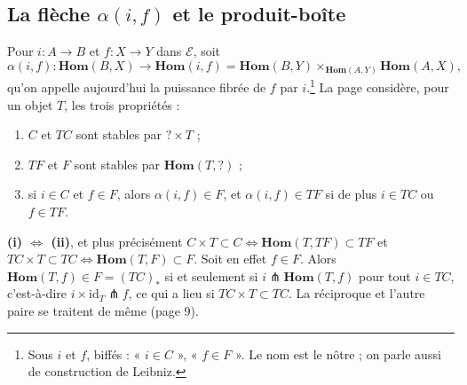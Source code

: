 \documentclass[11pt,a4paper]{article}
\begin{document}
\subsection*{La flèche $\alpha(i,f)$ et le produit-boîte}

Pour $i : A \to B$ et $f : X \to Y$ dans $\mathcal{E}$, soit
\[
\alpha(i,f) : \mathbf{Hom}(B, X) \longrightarrow \mathbf{Hom}(i,f)
= \mathbf{Hom}(B, Y) \times_{\mathbf{Hom}(A, Y)} \mathbf{Hom}(A, X),
\]
qu'on appelle aujourd'hui la puissance fibrée de $f$ par $i$.\footnote{Sous
$i$ et $f$, biffés : « $i \in C$ », « $f \in F$ ». Le nom est le nôtre ;
on parle aussi de construction de Leibniz.} La page considère, pour un objet
$T$, les trois propriétés :
\begin{enumerate}
\item[(i)] $C$ et $TC$ sont stables par $? \times T$ ;
\item[(ii)] $TF$ et $F$ sont stables par $\mathbf{Hom}(T, ?)$ ;
\item[(iii)] si $i \in C$ et $f \in F$, alors $\alpha(i,f) \in F$, et
$\alpha(i,f) \in TF$ si de plus $i \in TC$ ou $f \in TF$.
\end{enumerate}

\textbf{(i) $\Leftrightarrow$ (ii)}, et plus précisément
$C \times T \subset C \Leftrightarrow \mathbf{Hom}(T, TF) \subset TF$ et
$TC \times T \subset TC \Leftrightarrow \mathbf{Hom}(T, F) \subset F$. Soit
en effet $f \in F$. Alors $\mathbf{Hom}(T, f) \in F = (TC)_*$ si et seulement
si $i \pitchfork \mathbf{Hom}(T, f)$ pour tout $i \in TC$, c'est-à-dire
$i \times \mathrm{id}_T \pitchfork f$, ce qui a lieu si $TC \times T \subset
TC$. La réciproque et l'autre paire se traitent de même (page 9).
\end{document}
